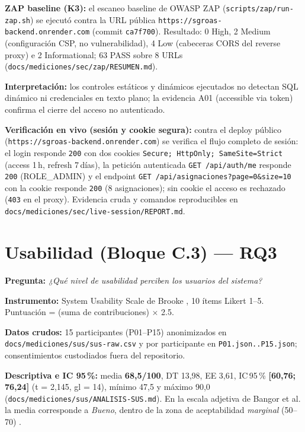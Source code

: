 \textbf{ZAP baseline (K3):} el escaneo baseline de OWASP ZAP
(\texttt{scripts/zap/run-zap.sh}) se ejecutó contra la URL pública
\texttt{https://sgroas-backend.onrender.com} (commit \texttt{ca7f700}). Resultado: 0
High, 2 Medium (configuración CSP, no vulnerabilidad), 4 Low (cabeceras CORS del
reverse proxy) e 2 Informational; 63 PASS sobre 8 URLs
(\texttt{docs/mediciones/sec/zap/RESUMEN.md}).

\textbf{Interpretación:} los controles estáticos y dinámicos ejecutados no detectan
SQL dinámico ni credenciales en texto plano; la evidencia A01 (accessible via
token) confirma el cierre del acceso no autenticado.

\textbf{Verificación en vivo (sesión y cookie segura):} contra el deploy público
(\texttt{https://sgroas-backend.onrender.com}) se verifica el flujo completo de
sesión: el login responde \texttt{200} con dos cookies
\texttt{Secure; HttpOnly; SameSite=Strict} (access 1\,h, refresh 7\,días), la petición
autenticada \texttt{GET /api/auth/me} responde \texttt{200} (ROLE\_ADMIN) y el
endpoint \texttt{GET /api/asignaciones?page=0\&size=10} con la cookie responde
\texttt{200} (8 asignaciones); sin cookie el acceso es rechazado (\texttt{403} en el
proxy). Evidencia cruda y comandos reproducibles en
\texttt{docs/mediciones/sec/live-session/REPORT.md}.

\section{Usabilidad (Bloque C.3) — RQ3}
\label{sec:sus}

\textbf{Pregunta:} \emph{¿Qué nivel de usabilidad perciben los usuarios del
sistema?}

\textbf{Instrumento:} System Usability Scale de Brooke \cite{brooke1996}, 10 ítems
Likert 1--5. Puntuación = (suma de contribuciones) $\times$ 2.5.

\textbf{Datos crudos:} 15 participantes (P01--P15) anonimizados en
\texttt{docs/mediciones/sus/sus-raw.csv} y por participante en
\texttt{P01.json..P15.json}; consentimientos custodiados fuera del repositorio.

\textbf{Descriptiva e IC 95\,\%:} media \textbf{68,5/100}, DT 13,98, EE 3,61, IC\,95\,\%
\textbf{[60,76; 76,24]} (t = 2,145, gl = 14), mínimo 47,5 y máximo 90,0
(\texttt{docs/mediciones/sus/ANALISIS-SUS.md}). En la escala adjetiva de Bangor et
al. \cite{bangor2009,bangor2008} la media corresponde a \emph{Bueno}, dentro de la
zona de aceptabilidad \emph{marginal} (50--70) \cite{lewis2009}.

